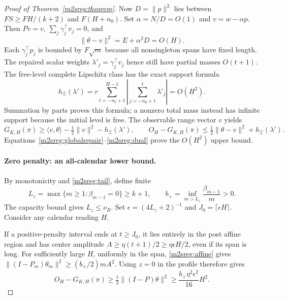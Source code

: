 \documentclass[11pt]{article}
\begin{document}
\begin{proof}[Proof of Theorem~\ref{m2sreg:theorem}]
Now $D=\|p\|^2$ lies between $FS\ge FH/(k+2)$ and $F(H+n_0)$.
Set $\alpha=N/D=O(1)$ and $v=w-\alpha p$.
Then $Pv=v$, $\sum_j\gamma_j^\top v_j=0$, and
\begin{equation}\label{m2sreg:globalrepair}
\|\theta-v\|^2=E+\alpha^2D=O(H).
\end{equation}
Each $\gamma_j^\top p_j$ is bounded by $F\sqrt m$ because
all nonsingleton spans have fixed length. The repaired scalar weights
$\lambda'_j=\gamma_j^\top v_j$ hence still have partial masses $O(t+1)$.
The free-level complete Lipschitz class has the exact support formula
\begin{equation}\label{m2sreg:support}
h_{\mathcal Z}(\lambda')=
r\sum_{t=-n_0+1}^{H-1}
 \left|\sum_{j=-n_0+1}^t\lambda'_j\right|=O(H^2).
\end{equation}
Summation by parts proves this formula; a nonzero total mass instead
has infinite support because the initial level is free.
The observable range vector $v$ yields
\begin{equation}\label{m2sreg:dual}
G_{K,H}(\pi)\ge
 \langle v,\theta\rangle-\tfrac12\|v\|^2-h_{\mathcal Z}(\lambda'),
\qquad
O_H-G_{K,H}(\pi)\le
 \tfrac12\|\theta-v\|^2+h_{\mathcal Z}(\lambda').
\end{equation}
Equations~\eqref{m2sreg:globalrepair}--\eqref{m2sreg:dual}
prove the $O(H^2)$ upper bound.

\paragraph{Zero penalty: an all-calendar lower bound.}
By monotonicity and \eqref{m2sreg:tail}, define finite
\[
L_z=\max\{m\ge1:\beta_{m-1}=0\}\ge k+1,\qquad
b_+=\inf_{m>L_z}\frac{\beta_{m-1}}m>0 .
\]
The capacity bound gives $L_z\le\nu_R$.
Set $\epsilon=(4L_z+2)^{-1}$ and $J_0=\lceil\epsilon H\rceil$.
Consider any calendar reading $H$.

If a positive-penalty interval ends at $t\ge J_0$, it lies entirely
in the post affine region and has center amplitude
$A\ge\eta(t+1)/2\ge\eta\epsilon H/2$, even if its span is long.
For sufficiently large $H$, uniformly in the span,
\eqref{m2sreg:affine} gives
$\|(I-P_m)\theta_m\|^2\ge(b_+/2)mA^2$.
Using $z=0$ in the profile therefore gives
\begin{equation}\label{m2sreg:positivecase}
O_H-G_{K,H}(\pi)\ge\tfrac12\|(I-P)\theta\|^2
\ge \frac{b_+\eta^2\epsilon^2}{16}H^2 .
\end{equation}


\end{proof}
\end{document}
